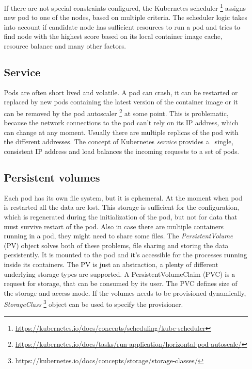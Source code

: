 \documentclass[
  digital, %
  twoside, %
  table,   %
  lof,     %
  lot,     %
]{fithesis3}
\begin{document}
If there are not special constraints configured, the Kubernetes scheduler \footnote{\url{https://kubernetes.io/docs/concepts/scheduling/kube-scheduler}} assigns new pod to one of the nodes, based on multiple criteria. The scheduler logic takes into account if candidate node has sufficient resources to run a pod and tries to find node with the highest score based on its local container image cache, resource balance and many other factors.

\subsection{Service} \label{sec:service}
Pods are often short lived and volatile. A pod can crash, it can be restarted or replaced by new pods containing the latest version of the container image or it can be removed by the pod autoscaler \footnote{\url{https://kubernetes.io/docs/tasks/run-application/horizontal-pod-autoscale/}} at some point. This is problematic, because the network connections to the pod can't rely on its IP address, which can change at any moment. Usually there are multiple replicas of the pod with the different addresses. The concept of Kubernetes \textit{service} provides a \
single, consistent IP address and load balances the incoming requests to a set of pods.

\subsection{Persistent volumes} \label{sec:pv}
Each pod has its own file system, but it is ephemeral. At the moment when pod is restarted all the data are lost. This storage is sufficient for the configuration, which is regenerated during the initialization of the pod, but not for data that must survive restart of the pod. Also in case there are multiple containers running in a pod, they might need to share some files. The \textit{PersistentVolume} (PV) object solves both of these problems, file sharing and storing the data persistently. It is mounted to the pod and it's accessible for the processes running inside its containers. The PV is just an abstraction, a plenty of different underlying storage types are supported. A PersistentVolumeClaim (PVC) is a request for storage, that can be consumed by its user. The PVC defines size of the storage and access mode. If the volumes needs to be provisioned dynamically, \textit{StorageClass} \footnote{https://kubernetes.io/docs/concepts/storage/storage-classes/} object can be used to specify the provisioner.
\end{document}
